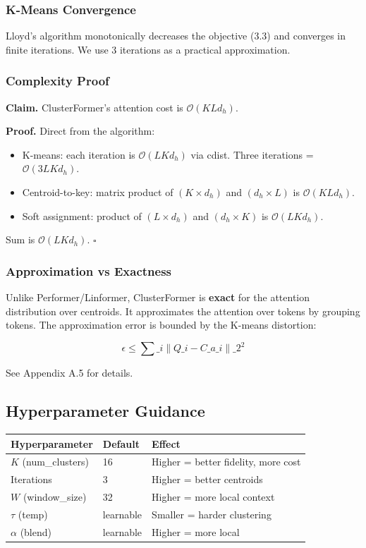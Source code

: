 \subsubsection{K-Means Convergence}

Lloyd's algorithm monotonically decreases the objective (3.3) and converges 
in finite iterations. We use 3 iterations as a practical approximation.

\subsubsection{Complexity Proof}

\textbf{Claim.} ClusterFormer's attention cost is $\mathcal{O}(K L d_h)$.

\textbf{Proof.} Direct from the algorithm:

\begin{itemize}
\item K-means: each iteration is $\mathcal{O}(L K d_h)$ via cdist. Three
  iterations = $\mathcal{O}(3 L K d_h)$.
\item Centroid-to-key: matrix product of $(K \times d_h)$ and $(d_h \times L)$
  is $\mathcal{O}(K L d_h)$.
\item Soft assignment: product of $(L \times d_h)$ and $(d_h \times K)$ is
  $\mathcal{O}(L K d_h)$.

\end{itemize}
Sum is $\mathcal{O}(L K d_h)$. $\square$

\subsubsection{Approximation vs Exactness}

Unlike Performer/Linformer, ClusterFormer is \textbf{exact} for the attention 
distribution over centroids. It approximates the attention over tokens by 
grouping tokens. The approximation error is bounded by the K-means 
distortion:

\[
\epsilon \leq \sum\_i \|Q\_i - C\_{a\_i}\|\_2^2
\]

See Appendix A.5 for details.

\subsection{Hyperparameter Guidance}

\begin{table}[H]
\centering
\small
\begin{tabular}{lll}
\toprule
\textbf{Hyperparameter} & \textbf{Default} & \textbf{Effect} \\
\midrule
$K$ (num\_clusters) & 16 & Higher = better fidelity, more cost \\
Iterations & 3 & Higher = better centroids \\
$W$ (window\_size) & 32 & Higher = more local context \\
$\tau$ (temp) & learnable & Smaller = harder clustering \\
$\alpha$ (blend) & learnable & Higher = more local \\
\bottomrule
\end{tabular}
\end{table}

